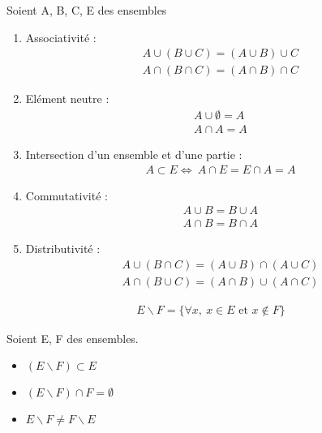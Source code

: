     \begin{proposition} Soient A, B, C, E des ensembles
	\begin{enumerate}
		\item Associativité :
		\begin{align*}
            A \cup (B \cup C) = (A \cup B) \cup C \\
            A \cap (B \cap C) = (A \cap B) \cap C
		\end{align*}
		\item Elément neutre : 
		\begin{align*}
            A \cup \emptyset = A \\
            A \cap A = A 
		\end{align*}
		\item Intersection d'un ensemble et d'une partie :
		\begin{align*}
            A \subset E \iff \ A \cap E = E \cap A = A
		\end{align*}
		\item Commutativité :
		\begin{align*}
            A \cup B = B \cup A \\
            A \cap B = B \cap A	
		\end{align*}
		\item Distributivité :
		\begin{align*}
            A \cup (B \cap C) = (A \cup B) \cap (A \cup C) \\
            A \cap (B \cup C) = (A \cap B) \cup (A \cap C)	
		\end{align*}
	\end{enumerate}
\end{proposition}


    \begin{definition}
	\begin{align*}
        E \backslash F = \{\forall x,\ x \in E \text{ et } x \notin F \}	
	\end{align*}
\end{definition}


\begin{remarque}Soient E, F des ensembles.
	\begin{itemize}
		\item $(E \backslash F) \subset E$
		\item $(E \backslash F) \cap F = \emptyset$
		\item $E \backslash F \neq F \backslash E$
	\end{itemize}
\end{remarque}



